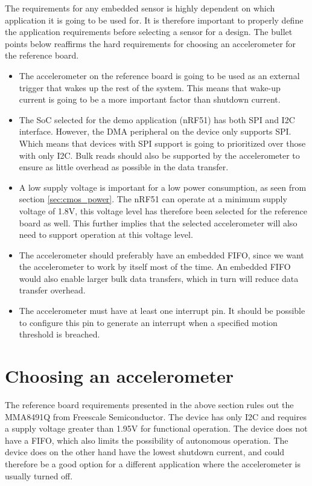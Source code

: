 The requirements for any embedded sensor is highly dependent on which application it is going to be used for. It is therefore important to properly define the application requirements before selecting a sensor for a design. The bullet points below reaffirms the hard requirements for choosing an accelerometer for the reference board. 

\begin{itemize}
\item The accelerometer on the reference board is going to be used as an external trigger that wakes up the rest of the system. This means that wake-up current is going to be a more important factor than shutdown current.
\item The SoC selected for the demo application (nRF51) has both SPI and I2C interface. However, the DMA peripheral on the device only supports SPI. Which means that devices with SPI support is going to prioritized over those with only I2C. Bulk reads should also be supported by the accelerometer to ensure as little overhead as possible in the data transfer. 
\item A low supply voltage is important for a low power consumption, as seen from section \ref{sec:cmos_power}. The nRF51 can operate at a minimum supply voltage of 1.8V, this voltage level has therefore been selected for the reference board as well. This further implies that the selected accelerometer will also need to support operation at this voltage level.
\item The accelerometer should preferably have an embedded FIFO, since we want the accelerometer to work by itself most of the time. An embedded FIFO would also enable larger bulk data transfers, which in turn will reduce data transfer overhead.
\item The accelerometer must have at least one interrupt pin. It should be possible to configure this pin to generate an interrupt when a specified motion threshold is breached.
\end{itemize}

\section{Choosing an accelerometer}

The reference board requirements presented in the above section rules out the MMA8491Q from Freescale Semiconductor. The device has only I2C and requires a supply voltage greater than 1.95V for functional operation. The device does not have a FIFO, which also limits the possibility of autonomous operation. The device does on the other hand have the lowest shutdown current, and could therefore be a good option for a different application where the accelerometer is usually turned off. 

